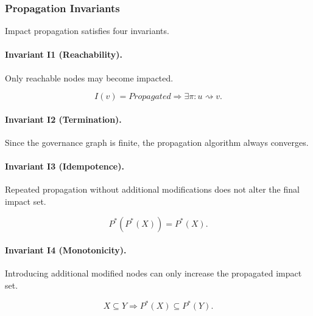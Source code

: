 \documentclass[10pt]{article}
\begin{document}
\subsubsection{Propagation Invariants}

Impact propagation satisfies four invariants.

\paragraph{Invariant I1 (Reachability).}

Only reachable nodes may become impacted.

\begin{equation}
I(v)=Propagated
\Longrightarrow
\exists
\pi
:
u
\rightsquigarrow
v.
\label{eq:prop_invariant1}
\end{equation}

\paragraph{Invariant I2 (Termination).}

Since the governance graph is finite, the propagation algorithm always converges.

\paragraph{Invariant I3 (Idempotence).}

Repeated propagation without additional modifications does not alter the final
impact set.

\begin{equation}
P^\ast(P^\ast(X))
=
P^\ast(X).
\label{eq:prop_invariant3}
\end{equation}

\paragraph{Invariant I4 (Monotonicity).}

Introducing additional modified nodes can only increase the propagated impact
set.

\begin{equation}
X
\subseteq
Y
\Longrightarrow
P^\ast(X)
\subseteq
P^\ast(Y).
\label{eq:prop_invariant4}
\end{equation}

\end{document}
